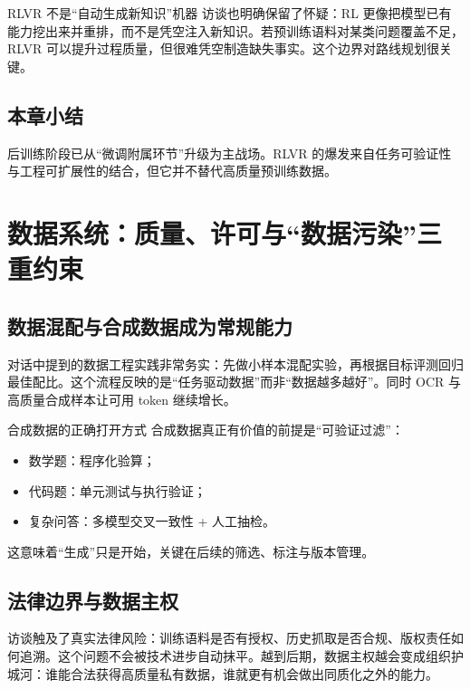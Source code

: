 \documentclass[a4paper]{article}
\begin{document}
\begin{warningbox}{RLVR 不是“自动生成新知识”机器}
访谈也明确保留了怀疑：RL 更像把模型已有能力挖出来并重排，而不是凭空注入新知识。若预训练语料对某类问题覆盖不足，RLVR 可以提升过程质量，但很难凭空制造缺失事实。这个边界对路线规划很关键。
\end{warningbox}

\subsection{本章小结}

后训练阶段已从“微调附属环节”升级为主战场。RLVR 的爆发来自任务可验证性与工程可扩展性的结合，但它并不替代高质量预训练数据。

\section{数据系统：质量、许可与“数据污染”三重约束}

\subsection{数据混配与合成数据成为常规能力}

对话中提到的数据工程实践非常务实：先做小样本混配实验，再根据目标评测回归最佳配比。这个流程反映的是“任务驱动数据”而非“数据越多越好”。同时 OCR 与高质量合成样本让可用 token 继续增长。

\begin{importantbox}{合成数据的正确打开方式}
合成数据真正有价值的前提是“可验证过滤”：
\begin{itemize}[leftmargin=1.5em]
    \item 数学题：程序化验算；
    \item 代码题：单元测试与执行验证；
    \item 复杂问答：多模型交叉一致性 + 人工抽检。
\end{itemize}
这意味着“生成”只是开始，关键在后续的筛选、标注与版本管理。
\end{importantbox}

\subsection{法律边界与数据主权}

访谈触及了真实法律风险：训练语料是否有授权、历史抓取是否合规、版权责任如何追溯。这个问题不会被技术进步自动抹平。越到后期，数据主权越会变成组织护城河：谁能合法获得高质量私有数据，谁就更有机会做出同质化之外的能力。
\end{document}

